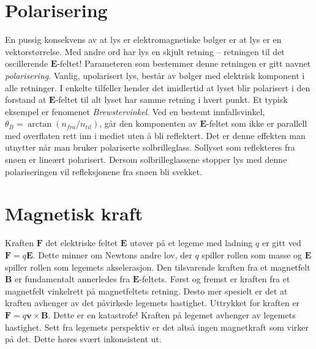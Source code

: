 \documentclass[twoside,utf8]{article}
\begin{document}
\section{Polarisering}
En pussig konsekvens av at lys er elektromagnetiske bølger er at lys er en vektorstørrelse. Med andre ord har lys en skjult retning -- retningen til det oscillerende $\mathbf{E}$-feltet! Parameteren som bestemmer denne retningen er gitt navnet {\it polarisering}. Vanlig, upolarisert lys, består av bølger med elektrisk komponent i alle retninger. I enkelte tilfeller hender det imidlertid at lyset blir polarisert i den forstand at $\mathbf{E}$-feltet til alt lyset har samme retning i hvert punkt. Et typisk eksempel er fenomenet {\it Brewstervinkel}. Ved en bestemt innfallsvinkel, $\theta_B=\arctan (n_{fra}/n_{til})$, går den komponenten av $\mathbf{E}$-feltet som ikke er parallell med overflaten rett inn i mediet uten å bli reflektert. Det er denne effekten man utnytter når man bruker polariserte solbrilleglass. Sollyset som reflekteres fra snøen er lineært polarisert. Dersom solbrilleglassene stopper lys med denne polariseringen vil refleksjonene fra snøen bli svekket.




\section{Magnetisk kraft}
Kraften $\mathbf{F}$ det elektriske feltet $\mathbf{E}$ utøver på et legeme med ladning $q$ er gitt ved $\mathbf{F}=q \mathbf{E}$. Dette minner om Newtons andre lov, der $q$ spiller rollen som masse og $\mathbf{E}$ spiller rollen som legemets akselerasjon.
Den tilsvarende kraften fra et magnetfelt $\mathbf{B}$ er fundamentalt annerledes fra $\mathbf{E}$-feltets. Først og fremst er kraften fra et magnetfelt vinkelrett på magnetfeltets retning. Desto mer spesielt er det at kraften avhenger av det påvirkede legemets hastighet. Uttrykket for kraften er $\mathbf{F}=q\mathbf{v}\times \mathbf{B}$.
Dette er en katastrofe! Kraften på legemet avhenger av legemets hastighet. Sett fra legemets perspektiv er det altså ingen magnetkraft som virker på det. Dette høres svært inkonsistent ut.
\end{document}
